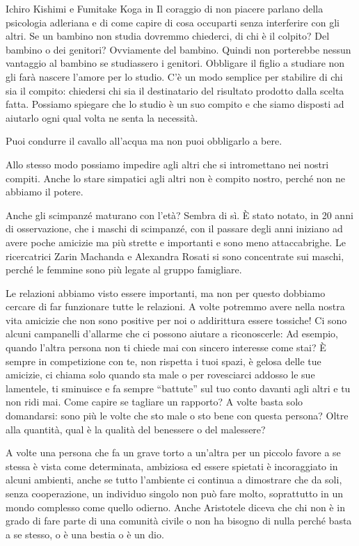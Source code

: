\documentclass[12pt]{book} %
\begin{document}
Ichiro Kishimi e Fumitake Koga in Il coraggio di non piacere parlano
della psicologia adleriana e di come capire di cosa occuparti senza interferire con gli altri. Se un bambino non studia
dovremmo chiederci, di chi è il colpito? Del bambino o dei genitori? Ovviamente del bambino. Quindi non porterebbe
nessun vantaggio al bambino se studiassero i genitori. Obbligare il figlio a studiare non gli farà nascere l'amore per
lo studio. C'è un modo semplice per stabilire di chi sia il compito: chiedersi chi sia il
destinatario del risultato prodotto dalla scelta fatta. Possiamo spiegare che lo studio è un suo compito e che siamo
disposti ad aiutarlo ogni qual volta ne senta la necessità.

Puoi condurre il cavallo all'acqua ma non puoi obbligarlo a bere.

Allo stesso modo possiamo impedire agli altri che si intromettano nei nostri compiti. Anche lo stare simpatici agli
altri non è compito nostro, perché non ne abbiamo il potere.

\begin{mdframed}[linewidth=1pt]
Anche gli scimpanzé maturano con l'età? Sembra di sì. È stato notato, in 20 anni di
osservazione, che i maschi di scimpanzé, con il passare degli anni iniziano ad avere poche amicizie ma più strette e
importanti e sono meno attaccabrighe. Le ricercatrici Zarin Machanda e Alexandra Rosati si sono concentrate sui maschi,
perché le femmine sono più legate al gruppo famigliare. 
\end{mdframed}

Le relazioni abbiamo visto essere importanti, ma non per questo dobbiamo cercare di far funzionare tutte le relazioni. A
volte potremmo avere nella nostra vita amicizie che non sono positive per noi o addirittura essere tossiche! Ci sono
alcuni campanelli d'allarme che ci possono aiutare a riconoscerle: Ad esempio, quando
l'altra persona non ti chiede mai con sincero interesse come stai? È sempre in competizione con
te, non rispetta i tuoi spazi, è gelosa delle tue amicizie, ci chiama solo quando sta male o per rovesciarci addosso le
sue lamentele, ti sminuisce e fa sempre “battute” sul tuo conto davanti agli altri e tu non ridi mai.
Come capire se tagliare un rapporto? A volte basta solo domandarsi: sono più le volte che sto male o sto bene con questa persona? Oltre alla quantità, qual è la qualità del benessere o del malessere?

A volte una persona che fa un grave torto a un'altra per un piccolo favore a se stessa è vista come
determinata, ambiziosa ed essere spietati è incoraggiato in alcuni ambienti, anche se tutto
l'ambiente ci continua a dimostrare che da soli, senza cooperazione, un individuo singolo non può
fare molto, soprattutto in un mondo complesso come quello odierno.
Anche Aristotele diceva che chi non è in grado
di fare parte di una comunità civile o non ha bisogno di nulla perché basta a se stesso, o è una bestia o è un dio.
\end{document}
